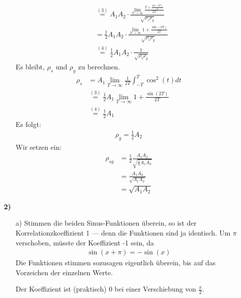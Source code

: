\documentclass[a4paper,11pt]{article}
\begin{document}
\begin{enumerate}
\begin{enumerate}
\begin{align*}
								  &\overset{(3)}{=} A_1A_2 \cdot \frac{\displaystyle \lim_{T \to \infty} \frac{T + \frac{\sin(2T)}{2}}{2T}}{\sqrt{\rho_s\rho_g}} \\
								  &= \frac{1}{2} A_1A_2 \cdot \frac{\displaystyle \lim_{T \to \infty} 1 + \frac{\sin(2T)}{2T}}{\sqrt{\rho_s\rho_g}} \\
								  &\overset{(4)}{=} \frac{1}{2}A_1A_2 \cdot \frac{1}{\sqrt{\rho_s\rho_g}}
					\end{align*}
					Es bleibt, $\rho_s$ und $\rho_g$ zu berechnen.
					\begin{align*}
						\rho_s &= A_1 \lim_{T \to \infty} \frac{1}{2T} \int_{-T}^T \cos^2(t) dt \\
							   &\overset{(3)}{=} \frac{1}{2} A_1 \lim_{T \to \infty} 1 + \frac{\sin(2T)}{2T} \\
							   &\overset{(4)}{=} \frac{1}{2} A_1
					\end{align*}
					Es folgt:
					\begin{align*}
						\rho_g = \frac{1}{2} A_2
					\end{align*}
					Wir setzen ein:
					\begin{align*}
						\rho_{sg} &= \frac{1}{2} \frac{A_1 A_2}{\sqrt{\frac{1}{4} A_1 A_2}} \\
								  &= \frac{A_1 A_2}{\sqrt{A_1 A_2}} \\
								  &= \sqrt{A_1 A_2}
					\end{align*}
			\end{enumerate}

		\item[\textbf{2)}]
			\begin{enumerate}
				\item[a)]
					Stimmen die beiden Sinus-Funktionen überein, so ist der
					Korrelationzkoeffizient 1 --- denn die Funktionen sind ja
					identisch. Um $\pi$ verschoben, müsste der Koeffizient -1
					sein, da
					\begin{align*}
					\sin(x + \pi) = -\sin(x)
					\end{align*}
					Die Funktionen stimmen sozusagen eigentlich überein,
					bis auf das Vorzeichen der einzelnen Werte.

					Der Koeffizient ist (praktisch) 0 bei einer Verschiebung
					von $\frac{\pi}{2}$.
			\end{enumerate}
	\end{enumerate}
\end{document}
